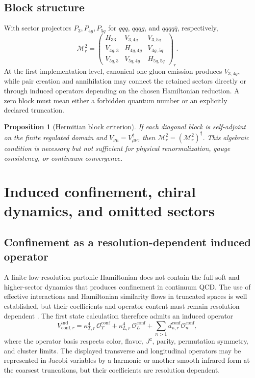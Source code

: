 \documentclass[11pt]{article}
\newtheorem{proposition}[definition]{Proposition}
\newcommand{\cO}{\mathcal O}
\newcommand{\cM}{\mathcal M}
\newcommand{\ind}{\mathrm{ind}}
\newcommand{\conf}{\mathrm{conf}}
\newcommand{\Jz}{J^z}
\begin{document}
\subsection{Block structure}

With sector projectors \(P_3,P_{4g},P_{5q}\) for
\(qqq\), \(qqqg\), and \(qqqq\bar q\), respectively,
\begin{equation}
 \cM_r^2=
 \begin{pmatrix}
  H_{33} & V_{3,4g} & V_{3,5q}\\
  V_{4g,3} & H_{4g,4g} & V_{4g,5q}\\
  V_{5q,3} & V_{5q,4g} & H_{5q,5q}
 \end{pmatrix}_r .
 \label{eq:block-hamiltonian}
\end{equation}
At the first implementation level, canonical one-gluon emission produces
\(V_{3,4g}\), while pair creation and annihilation may connect the retained
sectors directly or through induced operators depending on the chosen
Hamiltonian reduction.  A zero block must mean either a forbidden quantum
number or an explicitly declared truncation.

\begin{proposition}[Hermitian block criterion]
If each diagonal block is self-adjoint on the finite regulated domain and
\(V_{\nu\mu}=V_{\mu\nu}^{\dagger}\), then
\(\cM_r^2=(\cM_r^2)^\dagger\).  This algebraic condition is necessary but not
sufficient for physical renormalization, gauge consistency, or continuum
convergence.
\label{prop:block-hermiticity}
\end{proposition}

\section{Induced confinement, chiral dynamics, and omitted sectors}
\label{sec:induced}

\subsection{Confinement as a resolution-dependent induced operator}

A finite low-resolution partonic Hamiltonian does not contain the full soft and
higher-sector dynamics that produces confinement in continuum QCD.  The use of
effective interactions and Hamiltonian similarity flows in truncated spaces is
well established, but their coefficients and operator content must remain
resolution dependent \cite{Wilson1994,GlazekWilson1993,Wegner1994}.  The first
state calculation therefore admits an induced operator
\begin{equation}
 V_{\conf,r}^{\ind}
 =\kappa_{T,r}^{4}\,\cO_{T}^{\conf}
 +\kappa_{L,r}^{4}\,\cO_{L}^{\conf}
 +\sum_{n>1}d_{n,r}^{\conf}\cO_{n}^{\conf},
 \label{eq:induced-confinement}
\end{equation}
where the operator basis respects color, flavor, \(\Jz\), parity, permutation
symmetry, and cluster limits.  The displayed transverse and longitudinal
operators may be represented in Jacobi variables by a harmonic or another
smooth infrared form at the coarsest truncations, but their coefficients are
resolution dependent.
\end{document}
